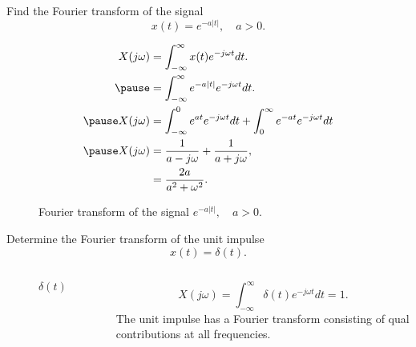 \begin{frame}
    \begin{example}
        Find the Fourier transform of the signal
        \begin{equation*}
            x(t) = e^{-a|t|}, \quad a> 0.
        \end{equation*}
    \end{example}
    \pause
    {
        \begin{equation*}
            \begin{aligned}
                X(j\omega) &= \int_{-\infty}^{\infty}x(t)e^{-j\omega t} dt.\\ \pause
                &= \int_{-\infty}^{\infty} e^{-a|t|} e^{-j\omega t} dt.\\ \pause
                X(j\omega) &= \int_{-\infty}^{0} e^{at}e^{-j\omega t}dt + \int_{0}^{\infty} e^{-at}e^{-j\omega t}dt\\ \pause
                X(j\omega) &= \frac{1}{a-j\omega} + \frac{1}{a+j\omega},\\
                &= \frac{2a}{a^2+\omega^2}.
            \end{aligned}
        \end{equation*}
    }
\end{frame}

\begin{frame}[plain]
    {
        \begin{figure}
          \centering
          
          \caption{Fourier transform of the signal $e^{-a|t|}, \quad a> 0$.}\label{fi:eat}
        \end{figure}
    }
\end{frame}




\begin{frame}
    \begin{example}
        Determine the Fourier transform of the unit impulse
        \begin{equation*}
            x(t) = \delta(t).
        \end{equation*}
    \end{example}
    \pause
    {
        \begin{columns}
                {
                    \begin{figure}
                      \centering
                      
                      \caption{$\delta(t)$}\label{fi:unit_impulse}
                    \end{figure}
                }
                \pause
                \begin{equation*}
                    X(j\omega) = \int_{-\infty}^{\infty} \delta(t)e^{-j\omega t} dt = 1.
                \end{equation*}
                The unit impulse has a Fourier transform consisting of qual contributions at all frequencies.
        \end{columns}
    }
\end{frame}


